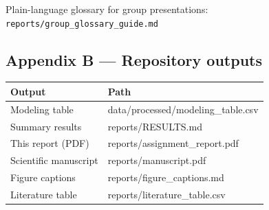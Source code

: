 \documentclass[
  11pt,
]{article}
\begin{document}
Plain-language glossary for group presentations:
\texttt{reports/group\_glossary\_guide.md}

\subsection{Appendix B --- Repository
outputs}\label{appendix-b-repository-outputs}

\begin{longtable}[]{@{}ll@{}}
\toprule\noalign{}
Output & Path \\
\midrule\noalign{}
\endhead
\bottomrule\noalign{}
\endlastfoot
Modeling table & data/processed/modeling\_table.csv \\
Summary results & reports/RESULTS.md \\
This report (PDF) & reports/assignment\_report.pdf \\
Scientific manuscript & reports/manuscript.pdf \\
Figure captions & reports/figure\_captions.md \\
Literature table & reports/literature\_table.csv \\
\end{longtable}
\end{document}
